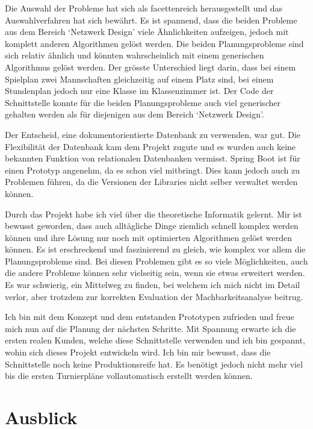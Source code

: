 Die Auswahl der Probleme hat sich als facettenreich herausgestellt und das Auswahlverfahren hat sich bewährt. Es ist spannend, dass die beiden Probleme aus dem Bereich `Netzwerk Design' 
viele Ähnlichkeiten aufzeigen, jedoch mit komplett anderen Algorithmen gelöst werden. Die beiden Planungsprobleme sind sich relativ ähnlich und könnten wahrscheinlich mit einem generischen 
Algorithmus gelöst werden. Der grösste Unterschied liegt darin, dass bei einem Spielplan zwei Mannschaften gleichzeitig auf einem Platz sind, bei einem 
Stundenplan jedoch nur eine Klasse im Klassenzimmer ist. Der Code der Schnittstelle konnte für die beiden Planungsprobleme auch viel generischer gehalten werden als für diejenigen aus dem Bereich 
`Netzwerk Design'.

Der Entscheid, eine dokumentorientierte Datenbank zu verwenden, war gut. Die Flexibilität der Datenbank kam dem Projekt zugute und es wurden auch keine bekannten Funktion von relationalen 
Datenbanken vermisst. Spring Boot ist für einen Prototyp angenehm, da es schon viel mitbringt. Dies kann jedoch auch zu Problemen führen, da die Versionen der Libraries nicht selber verwaltet 
werden können. 

Durch das Projekt habe ich viel über die theoretische Informatik gelernt. Mir ist bewusst geworden, dass auch alltägliche Dinge ziemlich schnell komplex werden können und ihre Lösung 
nur noch mit optimierten Algorithmen gelöst werden können. Es ist erschreckend und faszinierend zu gleich, wie komplex vor allem die Planungsprobleme sind. Bei diesen Problemen gibt es so viele 
Möglichkeiten, auch die andere Probleme können sehr vielseitig sein, wenn sie etwas erweitert werden. Es war schwierig, ein Mittelweg zu finden, bei welchem ich mich nicht im Detail verlor, aber 
trotzdem zur korrekten Evaluation der Machbarkeitsanalyse beitrug.

Ich bin mit dem Konzept und dem entstanden Prototypen zufrieden und freue mich nun auf die Planung der nächsten Schritte. Mit Spannung erwarte ich die ersten realen Kunden, welche diese 
Schnittstelle verwenden und ich bin gespannt, wohin sich dieses Projekt entwickeln wird. Ich bin mir bewusst, dass die Schnittstelle noch keine Produktionsreife hat. Es benötigt jedoch nicht mehr 
viel bis die ersten Turnierpläne vollautomatisch erstellt werden können.

\section{Ausblick}\label{fazit_ausblick}

